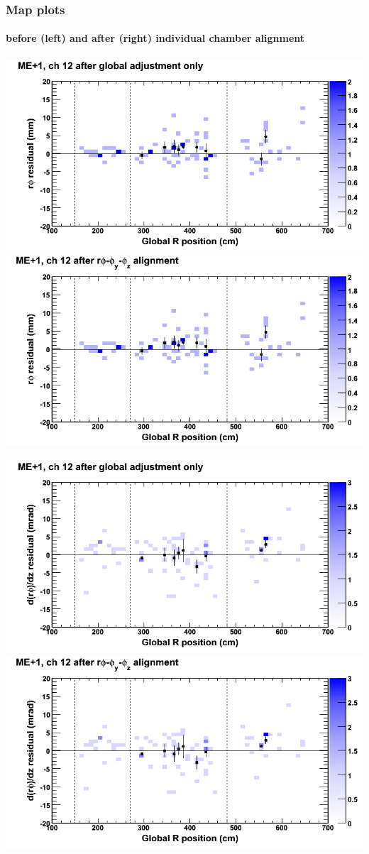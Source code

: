 \documentclass[compress]{beamer}
\begin{document}
\begin{frame}
\frametitle{Map plots}
\framesubtitle{before (left) and after (right) individual chamber alignment}
\includegraphics[width=0.5\linewidth]{ringmapplots_3dof/before_CSCvsr_mep1ch12_x.png} \includegraphics[width=0.5\linewidth]{ringmapplots_3dof/after_CSCvsr_mep1ch12_x.png}

\includegraphics[width=0.5\linewidth]{ringmapplots_3dof/before_CSCvsr_mep1ch12_dxdz.png} \includegraphics[width=0.5\linewidth]{ringmapplots_3dof/after_CSCvsr_mep1ch12_dxdz.png}
\end{frame}
\end{document}
